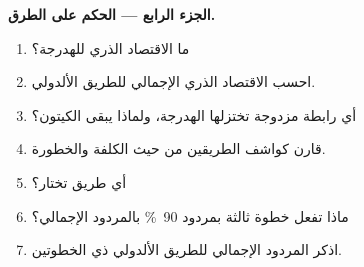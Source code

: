 \begin{problem}
\medskip
\noindent\textbf{الجزء الرابع --- الحكم على الطرق.}
\begin{enumerate}[resume]
  \item ما الاقتصاد الذري للهدرجة؟
  \item احسب الاقتصاد الذري الإجمالي للطريق الألدولي.
  \item أي رابطة مزدوجة تختزلها الهدرجة، ولماذا يبقى الكيتون؟
  \item قارن كواشف الطريقين من حيث الكلفة والخطورة.
  \item أي طريق تختار؟
  \item ماذا تفعل خطوة ثالثة بمردود 90~\% بالمردود الإجمالي؟
  \item اذكر المردود الإجمالي للطريق الألدولي ذي الخطوتين.
\end{enumerate}
\end{problem}
